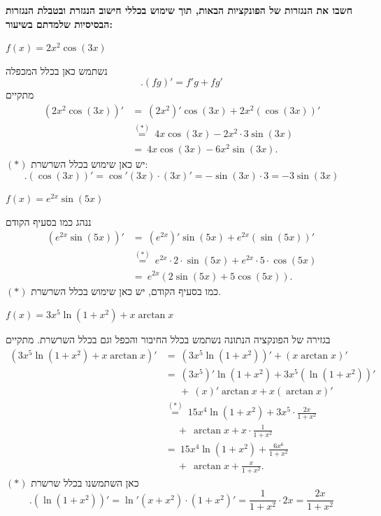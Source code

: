 \textbf{חשבו את הנגזרות של הפונקציות הבאות, תוך שימוש בכללי חישוב הנגזרת ובטבלת הנגזרות הבסיסיות שלמדתם בשיעור:}
\bE{}
\item $f(x)=2x^2\cos(3x)$
\begin{solbox}
נשתמש כאן בכלל המכפלה
$$.(fg)'=f'g+fg'$$
מתקיים
\begin{align*}
    \left(2x^2\cos(3x)\right)'&=\ (2x^2)'\cos(3x)+2x^2(\cos(3x))'\\
    &\overset{(\ast)}{=}\ 4x\cos(3x)-2x^2\cdot3\sin(3x)\\
    &=\ 4x\cos(3x)-6x^2\sin(3x).
\end{align*}
$(\ast)$
יש כאן שימוש בכלל השרשרת:
$$.(\cos(3x))'=\cos'(3x)\cdot(3x)'=-\sin(3x)\cdot3=-3\sin(3x)$$
\end{solbox}
\item $f(x)=e^{2x}\sin(5x)$
\begin{solbox}
ננהג כמו בסעיף הקודם
\begin{align*}
    \left(e^{2x}\sin(5x)\right)'&=\ (e^{2x})'\sin(5x)+e^{2x}(\sin(5x))'\\
    &\overset{(\ast)}{=}\ e^{2x}\cdot2\cdot\sin(5x)+e^{2x}\cdot5\cdot\cos(5x)\\
    &=\ e^{2x}(2\sin(5x)+5\cos(5x)).
\end{align*}
$(\ast)$
כמו בסעיף הקודם, יש כאן שימוש בכלל השרשרת.
\end{solbox}
\item $f(x)=3x^5\ln(1+x^2)+x\arctan x$
\begin{solbox}
בגזירה של הפונקציה הנתונה נשתמש בכלל החיבור והכפל וגם בכלל השרשרת. מתקיים
\begin{align*}
    (3x^5\ln(1+x^2)+x\arctan x)'&=\ (3x^5\ln(1+x^2))'+(x\arctan x)'\\
    &=\ (3x^5)'\ln(1+x^2)+3x^5(\ln(1+x^2))'\\
    &\quad\ \ +\ (x)'\arctan x+x(\arctan x)'\\
    &\overset{(\ast)}{=}\ 15x^4\ln(1+x^2)+3x^5\cdot\frac{2x}{1+x^2}\\
    &\quad\ +\ \arctan x+x\cdot\frac{1}{1+x^2}\\
    &=\ 15x^4\ln(1+x^2)+\frac{6x^6}{1+x^2}\\
    &\quad\ +\ \arctan x+\frac{x}{1+x^2}.
\end{align*}
$(\ast)$
כאן השתמשנו בכלל שרשרת
$$.(\ln(1+x^2))'=\ln'(x+x^2)\cdot(1+x^2)'=\frac{1}{1+x^2}\cdot 2x=\frac{2x}{1+x^2}$$
\end{solbox}
